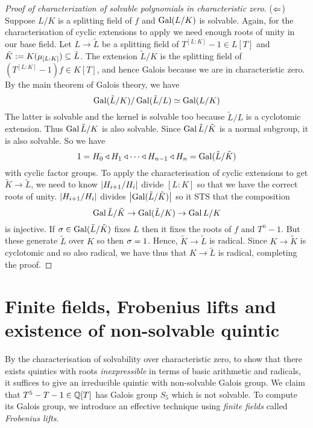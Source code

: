 \documentclass{article}
\begin{document}
\begin{proof}[Proof of characterization of solvable polynomials in characteristic zero]
  ($\Leftarrow$)
  Suppose $L / K$ is a splitting field of $f$ and
  $\operatorname{Gal}(L / K)$ is solvable.
  Again, for the characterisation of cyclic extensions to apply
  we need enough roots of unity in our base field.
  Let $L \to \tilde{L}$ be a splitting field of $T^{[L : K]} - 1 \in L[T]$
  and $\tilde{K} := K(\mu_{[L : K]}) \subseteq \tilde{L}$.
  The extension $\tilde{L} / K$ is the splitting field of
  $(T^{[L : K]} - 1) f \in K[T]$, and hence Galois because
  we are in characteristic zero.
  By the main theorem of Galois theory, we have \[
    \operatorname{Gal}(\tilde{L} / K) / \operatorname{Gal}(\tilde{L} / L) \simeq \operatorname{Gal}(L / K)
  \]
  The latter is solvable and the kernel is solvable too 
  because $\tilde{L} / L$ is a cyclotomic extension.
  Thus $\operatorname{Gal}{\tilde{L} / K}$ is also solvable.
  Since $\operatorname{Gal}{\tilde{L} / \tilde{K}}$ is a normal subgroup,
  it is also solvable.
  So we have
  \[
    1 = H_0 \triangleleft H_1 \triangleleft
    \cdots \triangleleft H_{n-1} \triangleleft H_n = \operatorname{Gal}(\tilde{L} / \tilde{K})
  \]
  with cyclic factor groups.
  To apply the characterisation of cyclic extensions
  to get $\tilde{K} \to \tilde{L}$,
  we need to know $\left\vert H_{i + 1} / H_i \right\vert$ divide $[L : K]$
  so that we have the correct roots of unity.
  $\left\vert H_{i + 1} / H_i \right\vert$ divides $\left\vert \operatorname{Gal}(\tilde{L} / \tilde{K}) \right\vert$
  so it STS that the composition 
  \[
    \operatorname{Gal}{\tilde{L} / \tilde{K}} \to \operatorname{Gal}(\tilde{L} / K) \to \operatorname{Gal}{L / K}
  \]
  is injective.
  If $\sigma \in \operatorname{Gal}(\tilde{L} / \tilde{K})$ fixes $L$
  then it fixes the roots of $f$ and $T^n - 1$.
  But these generate $\tilde{L}$ over $K$ so then $\sigma = 1$.
  Hence, $\tilde{K} \to \tilde{L}$ is radical.
  Since $K \to \tilde{K}$ is cyclotomic and so also radical,
  we have thus that $K \to \tilde{L}$ is radical, completing the proof.
\end{proof}

\section{Finite fields, Frobenius lifts and existence of non-solvable quintic}

By the characterisation of solvability over characteristic zero,
to show that there exists quintics with roots 
\emph{inexpressible} in terms of basic arithmetic and radicals,
it suffices to give an irreducible quintic with non-solvable Galois group.
We claim that $T^5 - T - 1 \in \mathbb{Q}[T]$ has Galois group $S_5$ 
which is not solvable.
To compute its Galois group, we introduce an effective technique
using \emph{finite fields} called \emph{Frobenius lifts}.
\end{document}
